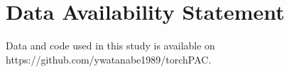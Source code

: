 
\section*{Data Availability Statement}
Data and code used in this study is available on https://github.com/ywatanabe1989/torchPAC.
\label{data and code availability}

